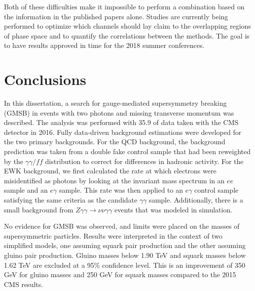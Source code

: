 Both of these difficulties 
make it impossible to perform a combination based on the information 
in the published papers alone.
Studies are currently being performed to optimize which channels should
lay claim to the overlapping regions of phase space 
and to quantify the correlations between the methods. The goal is to have
results approved in time for the 2018 summer conferences.

\section{Conclusions}
\label{sec:conclusions}
In this dissertation, a search for gauge-mediated supersymmetry breaking (GMSB) in events with two photons and missing transverse momentum was described. The analysis was performed with 35.9 \fbinv of data taken with the CMS detector in 2016. Fully data-driven background estimations were developed for the two primary backgrounds. For the QCD background, the background prediction was taken from a double fake control sample that had been reweighted by the $\gamma\gamma/ff$ \diempt distribution to correct for differences in hadronic activity. For the EWK background, we first calculated the rate at which electrons were misidentified as photons by looking at the invariant mass spectrum in an $ee$ sample and an $e\gamma$ sample. This rate was then applied to an $e\gamma$ control sample satisfying the same criteria as the candidate $\gamma\gamma$ sample. Additionally, there is a small background from $Z\gamma\gamma\rightarrow\nu\nu\gamma\gamma$ events that was modeled in simulation. 

No evidence for GMSB was observed, and limits were placed on the masses of supersymmetric particles. Results were interpreted in the context of two simplified models, one assuming squark pair production and the other assuming gluino pair production. Gluino masses below 1.90 TeV and squark masses below 1.62 TeV are excluded at a 95\% confidence level. This is an improvement of 350 GeV for gluino masses and 250 GeV for squark masses compared to the 2015 CMS results.